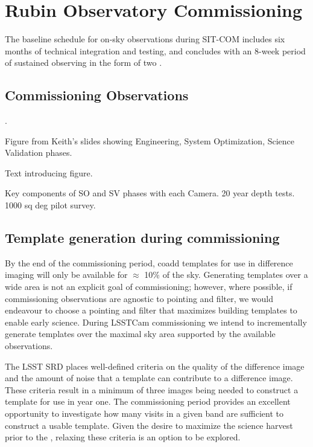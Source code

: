 \section{Rubin Observatory Commissioning}
\label{sec:commissioning}

The baseline schedule for on-sky observations during SIT-COM includes six months of technical integration and testing, and concludes with an 8-week period of sustained observing in the form of two \svs \citep{SCTN-007}.

\subsection{Commissioning Observations}

.

Figure from Keith's slides showing Engineering, System Optimization, Science Validation phases.

Text introducing figure.

Key components of SO and SV phases with each Camera. 20 year depth tests. 1000 sq deg pilot survey.


\subsection{Template generation during commissioning}

By the end of the commissioning period, coadd templates for use in difference imaging will only be available for $\approx$ 10\% of the sky.
Generating templates over a wide area is not an explicit goal of commissioning;  however, where possible, if commissioning observations are agnostic to pointing and filter, we would endeavour to choose a pointing and filter that maximizes building templates to enable early science.
During LSSTCam commissioning we intend to incrementally generate templates over the maximal sky area supported by the available observations.

The LSST SRD places well-defined criteria on the quality of the difference image and the amount of noise that a template can contribute to a difference image.
These criteria result in a minimum of three images being needed to construct a template for use in year one.
The commissioning period provides an excellent opportunity to investigate how many visits in a given band are sufficient to construct a usable template.
Given the desire to maximize the science harvest prior to the \drone,  relaxing these criteria is an option to be explored.

